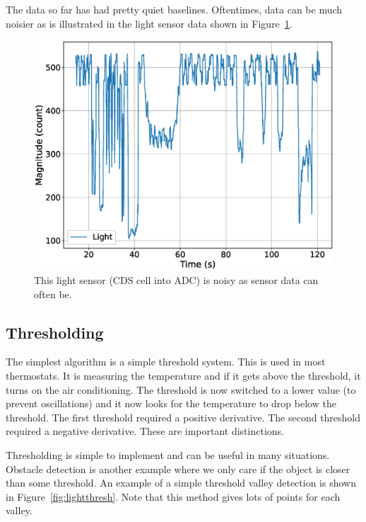 The data so far has had pretty quiet baselines. Oftentimes, data can be much noisier as is illustrated 
in the light sensor data shown in Figure~\ref{fig:lightpeaks}.

\begin{figure}[!htb]
	\centering
	\includegraphics[scale=0.4]{information/light.eps}
	\caption{This light sensor (CDS cell into ADC) is noisy as sensor data can often be.}
	\label{fig:lightpeaks}
\end{figure}

\subsection{Thresholding}
The simplest algorithm is a simple threshold system. This is used in most thermostats. It is measuring
the temperature and if it gets above the threshold, it turns on the air conditioning. The threshold 
is now switched to a lower value (to prevent oscillations) and it now looks for the temperature to 
drop below the threshold. The first threshold required a positive derivative. The second threshold 
required a negative derivative. These are important distinctions. 

Thresholding is simple to implement and can be useful in many situations. Obstacle detection is another 
example where we only care if the object is closer than some threshold. An example of a simple threshold
valley detection is shown in Figure~\ref{fig:lightthresh}. Note that this method gives lots of points
for each valley.

